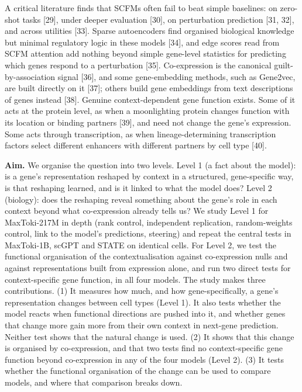 \documentclass[
  11pt,
]{article}
\begin{document}
A critical literature finds that SCFMs often fail to beat simple
baselines: on zero-shot tasks {[}29{]}, under deeper evaluation
{[}30{]}, on perturbation prediction {[}31, 32{]}, and across utilities
{[}33{]}. Sparse autoencoders find organised biological knowledge but
minimal regulatory logic in these models {[}34{]}, and edge scores read
from SCFM attention add nothing beyond simple gene-level statistics for
predicting which genes respond to a perturbation {[}35{]}. Co-expression
is the canonical guilt-by-association signal {[}36{]}, and some
gene-embedding methods, such as Gene2vec, are built directly on it
{[}37{]}; others build gene embeddings from text descriptions of genes
instead {[}38{]}. Genuine context-dependent gene function exists. Some
of it acts at the protein level, as when a moonlighting protein changes
function with its location or binding partners {[}39{]}, and need not
change the gene's expression. Some acts through transcription, as when
lineage-determining transcription factors select different enhancers
with different partners by cell type {[}40{]}.

\textbf{Aim.} We organise the question into two levels. Level 1 (a fact
about the model): is a gene's representation reshaped by context in a
structured, gene-specific way, is that reshaping learned, and is it
linked to what the model does? Level 2 (biology): does the reshaping
reveal something about the gene's role in each context beyond what
co-expression already tells us? We study Level 1 for MaxToki-217M in
depth (rank control, independent replication, random-weights control,
link to the model's predictions, steering) and repeat the central tests
in MaxToki-1B, scGPT and STATE on identical cells. For Level 2, we test
the functional organisation of the contextualisation against
co-expression nulls and against representations built from expression
alone, and run two direct tests for context-specific gene function, in
all four models. The study makes three contributions. (1) It measures
how much, and how gene-specifically, a gene's representation changes
between cell types (Level 1). It also tests whether the model reacts
when functional directions are pushed into it, and whether genes that
change more gain more from their own context in next-gene prediction.
Neither test shows that the natural change is used. (2) It shows that
this change is organised by co-expression, and that two tests find no
context-specific gene function beyond co-expression in any of the four
models (Level 2). (3) It tests whether the functional organisation of
the change can be used to compare models, and where that comparison
breaks down.
\end{document}
